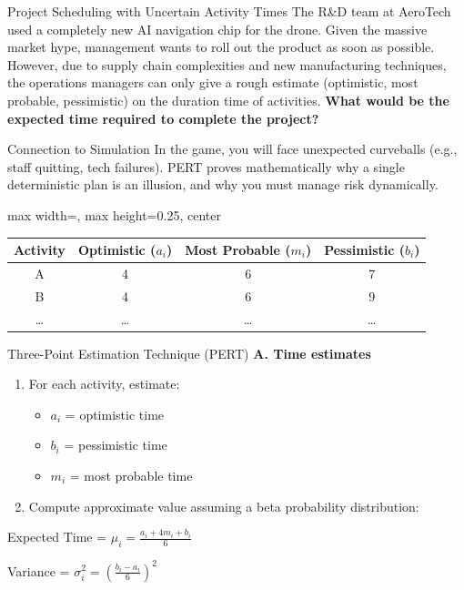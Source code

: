 \documentclass[11pt,aspectratio=169]{beamer}
\begin{document}
\begin{frame}{Project Scheduling with Uncertain Activity Times}
    The R\&D team at AeroTech used a completely new AI navigation chip for the drone. Given the massive market hype, management wants to roll out the product as soon as possible. However, due to supply chain complexities and new manufacturing techniques, the operations managers can only give a rough estimate (optimistic, most probable, pessimistic) on the duration time of activities. \textbf{What would be the expected time required to complete the project?}
    
    \vspace{0.5em}
    \begin{alertblock}{Connection to Simulation}
        In the game, you will face unexpected curveballs (e.g., staff quitting, tech failures). PERT proves mathematically why a single deterministic plan is an illusion, and why you must manage risk dynamically.
    \end{alertblock}
    
    \begin{adjustbox}{max width=\linewidth, max height=0.25\textheight, center}
    \begin{tabular}{cccc}
        \toprule
        \textbf{Activity} & \textbf{Optimistic ($a_i$)} & \textbf{Most Probable ($m_i$)} & \textbf{Pessimistic ($b_i$)} \\
        \midrule
        A & 4 & 6 & 7 \\
        B & 4 & 6 & 9 \\
        \dots & \dots & \dots & \dots \\
        \bottomrule
    \end{tabular}
    \end{adjustbox}
\end{frame}

\begin{frame}{Three-Point Estimation Technique (PERT)}
    \textbf{A. Time estimates}
    \begin{enumerate}
        \item For each activity, estimate:
        \begin{itemize}
            \item $a_i$ = optimistic time
            \item $b_i$ = pessimistic time
            \item $m_i$ = most probable time
        \end{itemize}
        \item Compute approximate value assuming a beta probability distribution:
    \end{enumerate}
    
    \vspace{1em}
    \begin{block}{}
        \centering
        Expected Time = $\mu_i = \frac{a_i + 4m_i + b_i}{6}$
    \end{block}
    
    \begin{block}{}
        \centering
        Variance = $\sigma_i^2 = \left(\frac{b_i - a_i}{6}\right)^2$
    \end{block}
\end{frame}
\end{document}

